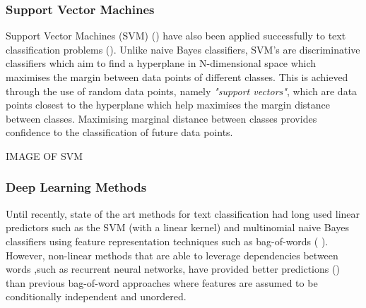 \subsubsection{Support Vector Machines}
\noindent
\newline 
Support Vector Machines (SVM) (\cite{Cortes1995}) have also been applied successfully to text classification problems (\cite{Joachims1998}). Unlike naive Bayes classifiers, SVM's are discriminative classifiers which aim to find a hyperplane in N-dimensional space which maximises the margin between data points of different classes. This is achieved through the use of random data points, namely \textit{"support vectors"}, which are data points closest to the hyperplane which help maximises the margin distance between classes. Maximising marginal distance between classes provides confidence to the classification of future data points.

\noindent
\newline 
IMAGE OF SVM

\subsubsection{Deep Learning Methods}
Until recently, state of the art methods for text classification had long used linear predictors such as the SVM (with a linear kernel) and multinomial naive Bayes classifiers using feature representation techniques such as bag-of-words (\cite{Joachims1998} \cite{Lewis2004}). However, non-linear methods that are able to leverage dependencies between words ,such as recurrent neural networks, have provided better predictions (\cite{Dai2015a}) than previous bag-of-word approaches where features are assumed to be conditionally independent and unordered.
